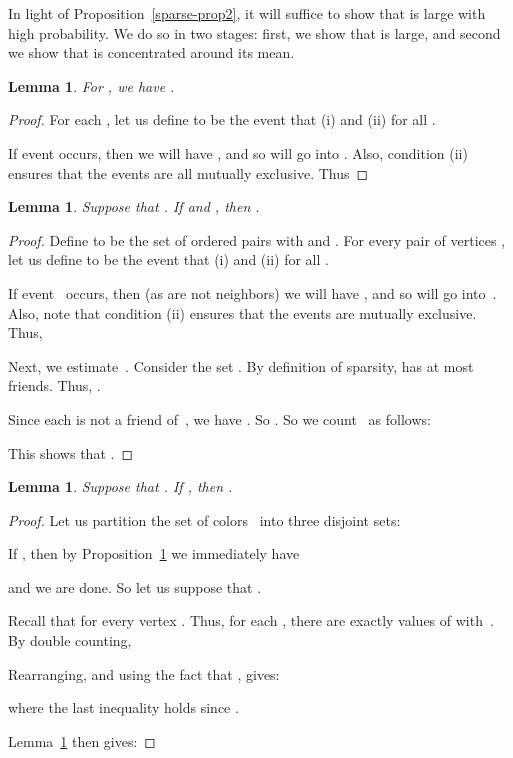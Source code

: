 \documentclass[11pt]{amsart}
\newtheorem{lemma}[theorem]{Lemma}
\begin{document}
In light of Proposition~\ref{sparse-prop2}, it will suffice to show that  is large with high probability. We do so in two stages: first, we show that  is large, and second we show that  is concentrated around its mean.
\begin{lemma} \label{sparse-prop3a}
For , we have .
\end{lemma}
\begin{proof}
For each , let us define  to be the event that (i)  and (ii)  for all . 

If event  occurs, then we will have , and so  will go into . Also, condition (ii) ensures that the events  are all mutually exclusive. Thus

\end{proof}

\begin{lemma}
\label{sparse-prop3}
Suppose that . If  and , then .
\end{lemma}
\begin{proof}
Define  to be the set of ordered pairs  with  and . For every pair of vertices , let us define  to be the event that (i)  and (ii)  for all . 

If event~ occurs, then (as  are not neighbors) we will have , and so  will go into~. Also, note that condition (ii) ensures that the events  are mutually exclusive. Thus,


Next, we estimate~. Consider the set . By definition of sparsity,  has at most  friends. Thus, .

Since each  is not a friend of~, we have .  So . So we count~ as follows:


This shows that .
\end{proof}

\begin{lemma}
\label{sparse-prop4}
Suppose that .  If , then .
\end{lemma}
\begin{proof}
Let us partition the set of colors~ into three disjoint sets:


If , then by Proposition~\ref{sparse-prop3} we immediately have 

and we are done. So let us suppose that . 

Recall that  for every vertex . Thus, for each , there are exactly  values of  with~. By double counting, 


Rearranging, and using the fact that , gives:

where the last inequality holds since .

Lemma~\ref{sparse-prop3a} then gives:

\end{proof}
\end{document}
